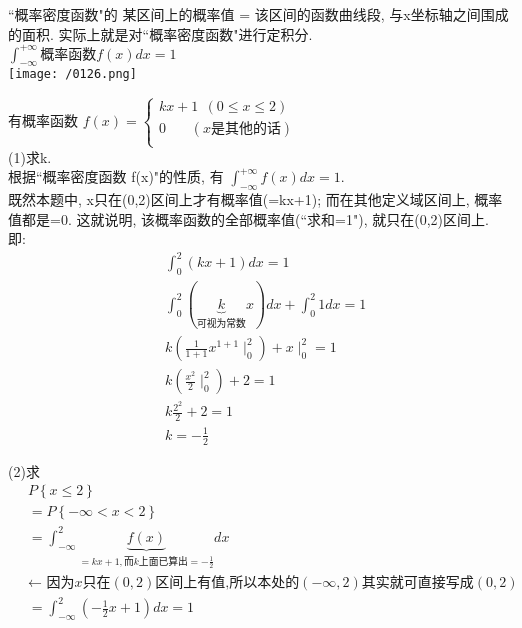 \documentclass[UTF8]{ctexart}
\begin{document}
	
	``概率密度函数"的 某区间上的概率值 = 该区间的函数曲线段, 与x坐标轴之间围成的面积. 实际上就是对``概率密度函数"进行定积分. \\
	
	
	$\int_{ - \infty }^{ + \infty } \text{概率函数}f(x)dx = 1$ \\
	\texttt{[image: /0126.png]} \\
	
	
	\begin{myEnvSample}
		有概率函数 $
		f\left( x \right) =\left\{ \begin{array}{l}
			kx+1\ \ \left( 0\leq x\leq 2 \right)\\
			0\ \ \ \ \ \ \ \ \left( x\text{是其他的话} \right)\\
		\end{array} \right. 
		$ \\
		
		(1)求k. \\
		根据``概率密度函数 f(x)"的性质, 有 $\int_{-\infty}^{+\infty}{f\left( x \right)} dx=1$. \\
		既然本题中, x只在(0,2)区间上才有概率值(=kx+1); 而在其他定义域区间上, 概率值都是=0. 这就说明, 该概率函数的全部概率值(``求和=1"), 就只在(0,2)区间上. \\
		
		即:
		\begin{align*}  %
			&\int_0^2{\left( kx+1 \right)}dx=1\\
			&\int_0^2{\left( \underset{\text{可视为常数}}{\underbrace{k}}x \right)}dx+\int_0^2{1}dx=1\\
			&k\left( \frac{1}{1+1}x^{1+1}\mid_{0}^{2} \right) +x\mid_{0}^{2}=1\\
			&k\left( \frac{x^2}{2}\mid_{0}^{2} \right) +2=1\\
			&k\frac{2^2}{2}+2=1\\
			&k=-\frac{1}{2}
		\end{align*} 
		
		
		
		(2)求
		\begin{align*}  %
			&P\left\{ x\leq 2 \right\}  \\
			&=P\left\{ -\infty <x<2 \right\}\\
			&	=\int_{-\infty}^2{\underset{=kx+1,\text{而}k\text{上面已算出}=-\frac{1}{2}}{\underbrace{f\left( x \right) }}}dx\\\
			&	\text{← 因为}x\text{只在}\left( 0,2 \right) \text{区间上有值,所以本处的}\left( -\infty ,2 \right) \text{其实就可直接写成}\left( 0,2 \right)\\
			&	=\int_{-\infty}^2{\left( -\frac{1}{2}x+1 \right)}dx=1
		\end{align*}
		

\end{myEnvSample}
\end{document}
